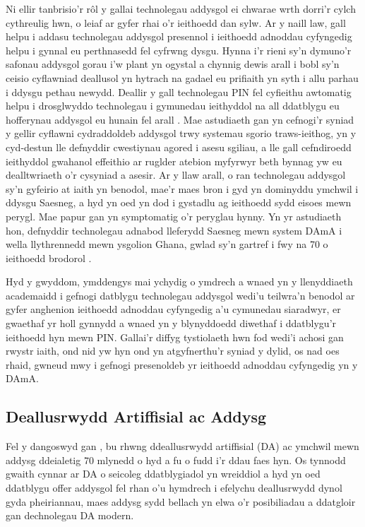 Ni ellir tanbrisio'r rôl y gallai technolegau addysgol ei chwarae wrth dorri'r cylch cythreulig hwn, o leiaf ar gyfer rhai o'r ieithoedd dan sylw. Ar y naill law, gall helpu i addasu technolegau addysgol presennol i ieithoedd adnoddau cyfyngedig helpu i gynnal eu perthnasedd fel cyfrwng dysgu. Hynna i'r rieni sy'n dymuno'r safonau addysgol gorau i'w plant yn ogystal a chynnig dewis arall i bobl sy'n ceisio cyflawniad deallusol yn hytrach na gadael eu prifiaith yn syth i allu parhau i ddysgu pethau newydd. Deallir y gall technolegau PIN fel cyfieithu awtomatig helpu i drosglwyddo technolegau i gymunedau ieithyddol na all ddatblygu eu hofferynau addysgol eu hunain fel arall \parencite{haddow_survey_2022}. Mae astudiaeth gan \textcite{horbach_crosslingual_2024} yn cefnogi'r syniad y gellir cyflawni cydraddoldeb addysgol trwy systemau sgorio traws-ieithog, yn y cyd-destun lle defnyddir cwestiynau agored i asesu sgiliau, a lle gall cefndiroedd ieithyddol gwahanol effeithio ar ruglder atebion myfyrwyr beth bynnag yw eu dealltwriaeth o'r cysyniad a asesir. Ar y llaw arall, o ran technolegau addysgol sy'n gyfeirio at iaith yn benodol, mae'r maes bron i gyd yn dominyddu ymchwil i ddysgu Saesneg, a hyd yn oed yn dod i gystadlu ag ieithoedd sydd eisoes mewn perygl. Mae papur gan \textcite{henkel_supporting_2025} yn symptomatig o'r peryglau hynny. Yn yr astudiaeth hon, defnyddir technolegau adnabod lleferydd Saesneg mewn system DAmA i wella llythrennedd mewn ysgolion Ghana, gwlad sy'n gartref i fwy na 70 o ieithoedd brodorol \parencite{noauthor_ghana_nodate}.

Hyd y gwyddom, ymddengys mai ychydig o ymdrech a wnaed yn y llenyddiaeth academaidd i gefnogi datblygu technolegau addysgol wedi'u teilwra'n benodol ar gyfer anghenion ieithoedd adnoddau cyfyngedig a'u cymunedau siaradwyr, er gwaethaf yr holl gynnydd a wnaed yn y blynyddoedd diwethaf i ddatblygu'r ieithoedd hyn mewn PIN\@. Gallai'r diffyg tystiolaeth hwn fod wedi'i achosi gan rwystr iaith, ond nid yw hyn ond yn atgyfnerthu'r syniad y dylid, os nad oes rhaid, gwneud mwy i gefnogi presenoldeb yr ieithoedd adnoddau cyfyngedig yn y DAmA\@.

\subsection{Deallusrwydd Artiffisial ac Addysg}
Fel y dangoswyd gan \textcite{doroudi_intertwined_2023}, bu rhwng ddeallusrwydd artiffisial (DA) ac ymchwil mewn addysg ddeialetig 70 mlynedd o hyd a fu o fudd i'r ddau faes hyn. Os tynnodd gwaith cynnar ar DA o seicoleg ddatblygiadol yn wreiddiol a hyd yn oed ddatblygu offer addysgol fel rhan o'u hymdrech i efelychu deallusrwydd dynol gyda pheiriannau, maes addysg sydd bellach yn elwa o'r posibiliadau a ddatgloir gan dechnolegau DA modern.

